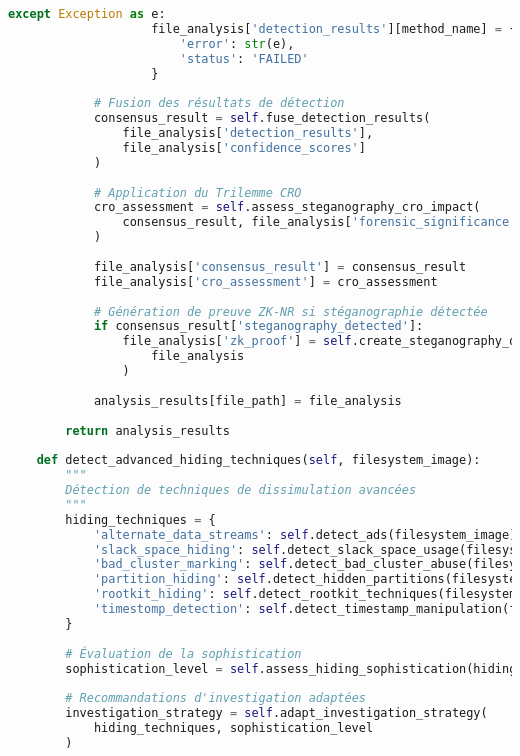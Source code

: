 \begin{lstlisting}[language=Python, caption=Système de détection de stéganographie multi-domaine]
                except Exception as e:
                    file_analysis['detection_results'][method_name] = {
                        'error': str(e),
                        'status': 'FAILED'
                    }
                    
            # Fusion des résultats de détection
            consensus_result = self.fuse_detection_results(
                file_analysis['detection_results'],
                file_analysis['confidence_scores']
            )
            
            # Application du Trilemme CRO
            cro_assessment = self.assess_steganography_cro_impact(
                consensus_result, file_analysis['forensic_significance']
            )
            
            file_analysis['consensus_result'] = consensus_result
            file_analysis['cro_assessment'] = cro_assessment
            
            # Génération de preuve ZK-NR si stéganographie détectée
            if consensus_result['steganography_detected']:
                file_analysis['zk_proof'] = self.create_steganography_detection_proof(
                    file_analysis
                )
                
            analysis_results[file_path] = file_analysis
            
        return analysis_results
    
    def detect_advanced_hiding_techniques(self, filesystem_image):
        """
        Détection de techniques de dissimulation avancées
        """
        hiding_techniques = {
            'alternate_data_streams': self.detect_ads(filesystem_image),
            'slack_space_hiding': self.detect_slack_space_usage(filesystem_image),
            'bad_cluster_marking': self.detect_bad_cluster_abuse(filesystem_image),
            'partition_hiding': self.detect_hidden_partitions(filesystem_image),
            'rootkit_hiding': self.detect_rootkit_techniques(filesystem_image),
            'timestomp_detection': self.detect_timestamp_manipulation(filesystem_image)
        }
        
        # Évaluation de la sophistication
        sophistication_level = self.assess_hiding_sophistication(hiding_techniques)
        
        # Recommandations d'investigation adaptées
        investigation_strategy = self.adapt_investigation_strategy(
            hiding_techniques, sophistication_level
        )
        

\end{lstlisting}
